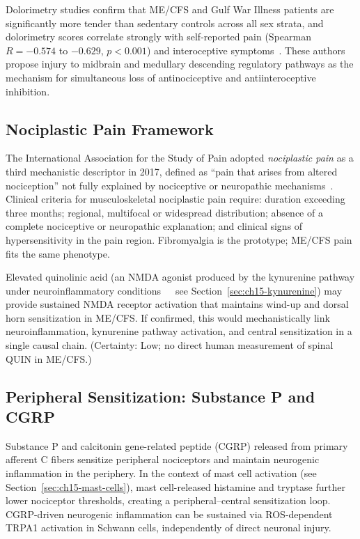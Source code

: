 Dolorimetry studies confirm that ME/CFS and Gulf War Illness patients are significantly more tender than sedentary controls across all sex strata, and dolorimetry scores correlate strongly with self-reported pain (Spearman $R = -0.574$ to $-0.629$, $p < 0.001$) and interoceptive symptoms~\cite{Baraniuk2025NociplasticMECFS}. These authors propose injury to midbrain and medullary descending regulatory pathways as the mechanism for simultaneous loss of antinociceptive and antiinteroceptive inhibition.

\subsection{Nociplastic Pain Framework}

The International Association for the Study of Pain adopted \textit{nociplastic pain} as a third mechanistic descriptor in 2017, defined as ``pain that arises from altered nociception'' not fully explained by nociceptive or neuropathic mechanisms~\cite{Kosek2024Nociplastic}. Clinical criteria for musculoskeletal nociplastic pain require: duration exceeding three months; regional, multifocal or widespread distribution; absence of a complete nociceptive or neuropathic explanation; and clinical signs of hypersensitivity in the pain region. Fibromyalgia is the prototype; ME/CFS pain fits the same phenotype.

\begin{speculation}
\label{spec:ch15-kynurenine-nmda}
Elevated quinolinic acid (an NMDA agonist produced by the kynurenine pathway under neuroinflammatory conditions~~~see Section~\ref{sec:ch15-kynurenine}) may provide sustained NMDA receptor activation that maintains wind-up and dorsal horn sensitization in ME/CFS. If confirmed, this would mechanistically link neuroinflammation, kynurenine pathway activation, and central sensitization in a single causal chain. (Certainty: Low; no direct human measurement of spinal QUIN in ME/CFS.)
\end{speculation}

\subsection{Peripheral Sensitization: Substance P and CGRP}

Substance P and calcitonin gene-related peptide (CGRP) released from primary afferent C fibers sensitize peripheral nociceptors and maintain neurogenic inflammation in the periphery. In the context of mast cell activation (see Section~\ref{sec:ch15-mast-cells}), mast cell-released histamine and tryptase further lower nociceptor thresholds, creating a peripheral--central sensitization loop. CGRP-driven neurogenic inflammation can be sustained via ROS-dependent TRPA1 activation in Schwann cells, independently of direct neuronal injury.

